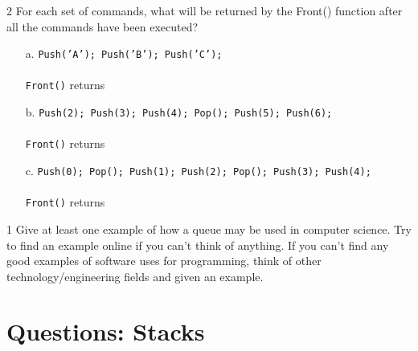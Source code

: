 \documentclass[a4paper,12pt,oneside]{book}
\newcounter{question}
\begin{document}
        \newpage
        \begin{question}{\thequestion}{2}
            For each set of commands, what will be returned by the Front()
            function after all the commands have been executed?

            \begin{itemize}
                \item[a.]   \texttt{Push('A'); Push('B'); Push('C');}
                    ~\\~\\
                    \texttt{Front()} returns 
                ~\\
                \item[b.]   \texttt{Push(2); Push(3); Push(4); Pop(); Push(5); Push(6);}
                    ~\\~\\
                    \texttt{Front()} returns 
                ~\\
                \item[c.]   \texttt{Push(0); Pop(); Push(1); Push(2); Pop(); Push(3); Push(4);}
                    ~\\~\\
                    \texttt{Front()} returns 
            \end{itemize}
        \end{question}

        \hrulefill
        \begin{question}{\thequestion}{1}
            Give at least one example of how a queue may be used in computer science.
            Try to find an example online if you can't think of anything.
            If you can't find any good examples of software uses for programming,
            think of other technology/engineering fields and given an example.
        \end{question}

        
    \newpage
    \section{Questions: Stacks}
\end{document}
